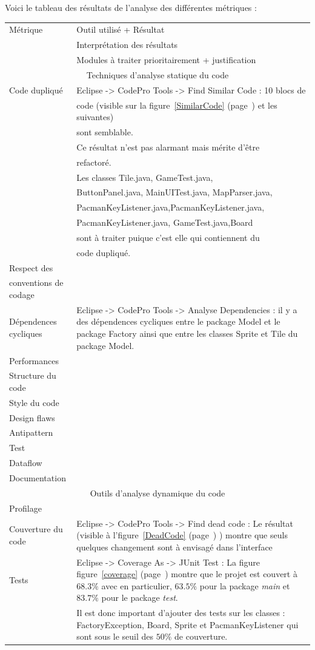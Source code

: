\documentclass[12pt,a4paper,final]{article}
\newcommand{\annexe}[1]{figure~\ref{#1} (page~\pageref{#1})}
\begin{document}
Voici le tableau des résultats de l'analyse des différentes métriques : 
\begin{tabular}{|l|l|}
\hline
Métrique & Outil utilisé + Résultat \\ & Interprétation des résultats \\ & Modules à traiter prioritairement + justification\\
\hline
\multicolumn{2}{|c|}{Techniques d'analyse statique du code} \\
\hline
Code dupliqué & Eclipse -> CodePro Tools -> Find Similar Code : 10 blocs de \\
& code (visible sur la \annexe{SimilarCode} et les suivantes)\\
& sont semblable. \\
& Ce résultat n'est pas alarmant mais mérite d'être\\
& refactoré. \\
& Les classes Tile.java, GameTest.java,  \\
& ButtonPanel.java, MainUITest.java, MapParser.java, \\
&  PacmanKeyListener.java,PacmanKeyListener.java, \\
&  PacmanKeyListener.java, GameTest.java,Board \\
& sont à traiter puique c'est elle qui contiennent du \\
& code dupliqué. \\
\hline
Respect des & \\
conventions de codage & \\
\hline
Dépendences cycliques & Eclipse -> CodePro Tools -> Analyse Dependencies : il y a des dépendences cycliques entre le package Model et le package Factory ainsi que entre les classes Sprite et Tile du package Model.\\
\hline
Performances & \\
\hline
Structure du code & \\
\hline
Style du code & \\
\hline
Design flaws  & \\
\hline
Antipattern  & \\
\hline
Test & \\
\hline
Dataflow  & \\
\hline
Documentation & \\
\hline
\multicolumn{2}{|c|}{Outils d'analyse dynamique du code} \\
\hline
Profilage & \\
\hline
Couverture du code & Eclipse -> CodePro Tools -> Find dead code : Le résultat (visible à l'\annexe{DeadCode} ) montre que seuls quelques changement sont à envisagé dans l'interface \\
\hline
Tests & Eclipse -> Coverage As -> JUnit Test : La figure \annexe{coverage} montre que le projet est couvert à $68.3 \%$ avec en particulier, $63.5\%$ pour la package \emph{main} et $83.7\%$ pour le package \emph{test}. \\
& Il est donc important d'ajouter des tests sur les classes : FactoryException, Board, Sprite et PacmanKeyListener qui sont sous le seuil des $50 \%$ de couverture.\\
\hline
\end{tabular}
\end{document}
